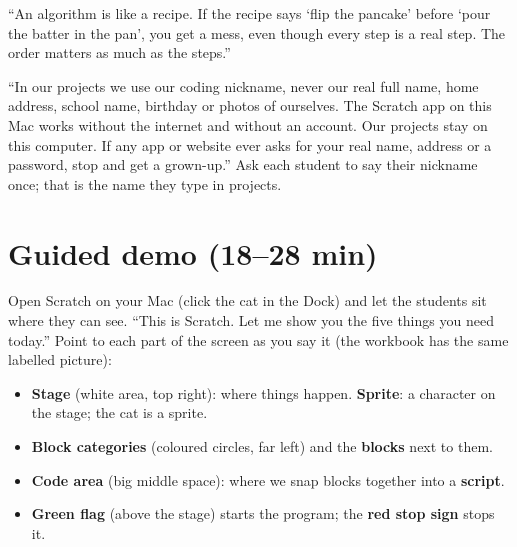\begin{analogy}
\enquote{An algorithm is like a recipe. If the recipe says \enquote{flip the pancake} before \enquote{pour the batter in the pan}, you get a mess, even though every step is a real step. The order matters as much as the steps.}
\end{analogy}

\begin{safety}
\enquote{In our projects we use our coding nickname, never our real full name, home address, school name, birthday or photos of ourselves. The Scratch app on this Mac works without the internet and without an account. Our projects stay on this computer. If any app or website ever asks for your real name, address or a password, stop and get a grown-up.} Ask each student to say their nickname once; that is the name they type in projects.
\end{safety}

\section{Guided demo (18--28 min)}
\begin{teacherscript}
Open Scratch on your Mac (click the cat in the Dock) and let the students sit where they can see. \enquote{This is Scratch. Let me show you the five things you need today.} Point to each part of the screen as you say it (the workbook has the same labelled picture):
\begin{itemize}[leftmargin=1.2em,itemsep=0pt]
  \item \textbf{Stage} (white area, top right): where things happen. \textbf{Sprite}: a character on the stage; the cat is a sprite.
  \item \textbf{Block categories} (coloured circles, far left) and the \textbf{blocks} next to them.
  \item \textbf{Code area} (big middle space): where we snap blocks together into a \textbf{script}.
  \item \textbf{Green flag} (above the stage) starts the program; the \textbf{red stop sign} stops it.
\end{itemize}
\end{teacherscript}

